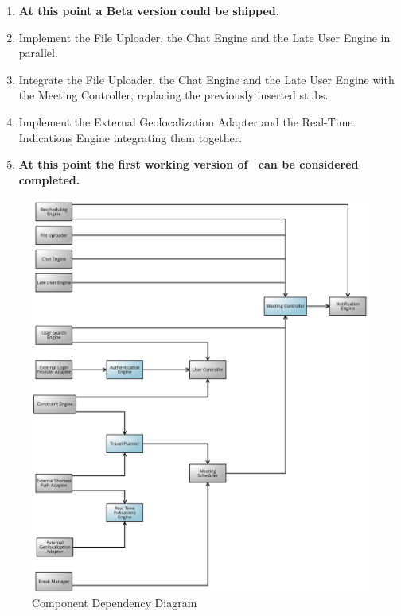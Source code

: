 \begin{enumerate}
	 \item[ ]
	\textbf{At this point a Beta version could be shipped.}
	 \item Implement the File Uploader, the Chat Engine and the Late User Engine in parallel.
	 \item Integrate the File Uploader, the Chat Engine and the Late User Engine with the Meeting Controller, replacing the previously inserted stubs.
	 \item Implement the External Geolocalization Adapter and the Real-Time Indications Engine integrating them together.
	 \item[ ]
	\textbf{At this point the first working version of \projectname~can be considered completed.}
\end{enumerate}

\begin{figure}[!h]
	\centering\includegraphics[scale = 0.19]{Images/UMLDiagrams/DependencyDiagramColored.png}
	\caption{Component Dependency Diagram}
\end{figure}

\clearpage